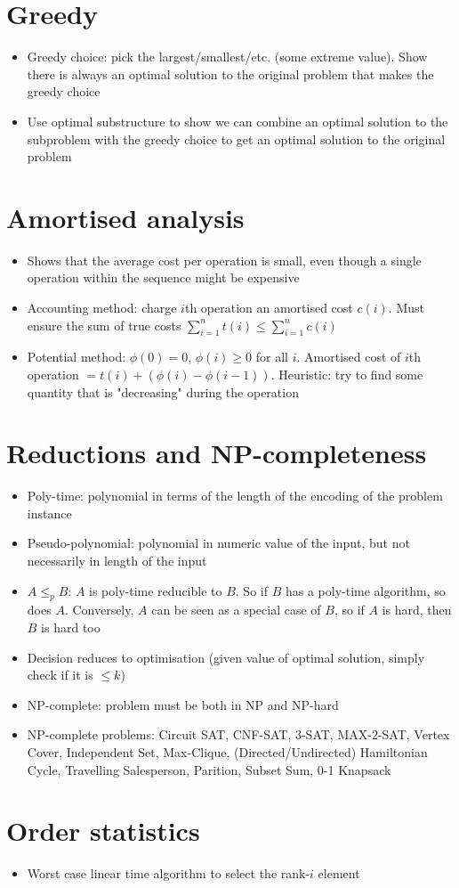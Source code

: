 \documentclass[11pt]{article}
\theoremstyle{remark}
\begin{document}
\section{Greedy}
\begin{itemize}
    \item Greedy choice: pick the largest/smallest/etc. (some extreme value). Show there is always an
        optimal solution to the original problem that makes the greedy choice
    \item Use optimal substructure to show we can combine an optimal solution to the subproblem with the
        greedy choice to get an optimal solution to the original problem
\end{itemize}

\section{Amortised analysis}
\begin{itemize}
    \item Shows that the average cost per operation is small, even though a single operation within the
        sequence might be expensive
    \item Accounting method: charge $i$th operation an amortised cost  $c(i)$. Must ensure the sum of true
        costs  $\sum_{i=1}^nt(i)\leq\sum_{i=1}^nc(i)$ 
    \item Potential method: $\phi(0)=0$,  $\phi(i)\geq 0$ for all  $i$. Amortised cost of  $i$th operation
        $=t(i)+(\phi(i)-\phi(i-1))$. Heuristic: try to find some quantity that is "decreasing" during the
        operation
\end{itemize}

\section{Reductions and NP-completeness}
\begin{itemize}
    \item Poly-time: polynomial in terms of the length of the encoding of the problem instance
    \item Pseudo-polynomial: polynomial in numeric value of the input, but not necessarily in length of the
        input
    \item $A\leq_p B$: $A$ is poly-time reducible to  $B$. So if  $B$ has a poly-time algorithm, so does
        $A$. Conversely, $A$ can be seen as a special case of  $B$, so if  $A$ is hard, then  $B$ is hard
        too
    \item Decision reduces to optimisation (given value of optimal solution, simply check if it is  $\leq
        k$)
    \item NP-complete: problem must be both in NP and NP-hard
    \item NP-complete problems: Circuit SAT, CNF-SAT, 3-SAT,
        MAX-2-SAT, Vertex Cover, Independent Set, Max-Clique,
        (Directed/Undirected) Hamiltonian Cycle,
        Travelling Salesperson, Parition, Subset Sum, 0-1 Knapsack
\end{itemize}

\section{Order statistics}
\begin{itemize}
    \item Worst case linear time algorithm to select the rank-$i$ element
\end{itemize}
\end{document}
